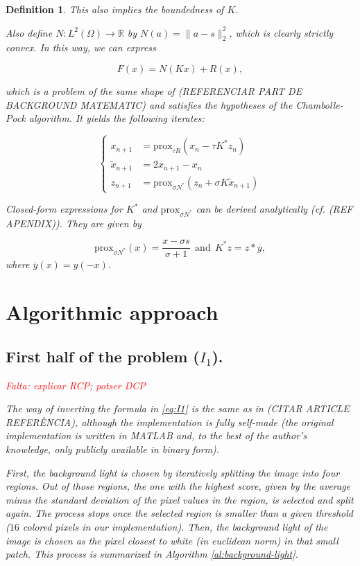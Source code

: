 \documentclass[twocolumn,twoside,a4paper,10pt]{IEEEtran}
\newtheorem{definition}{Definition}
\newcommand{\Frank}[1]{\textcolor{red}{#1}}
\begin{document}
\begin{definition}
This also implies the boundedness of \(K\).

Also define \(N\colon L^2(\Omega)\to \mathbb{R}\) by \(N(a) = \|a - s\|_{2}^2\), which is clearly strictly convex. In this way, we can express

\[
  F(x) = N(Kx) + R(x),
\]

which is a problem of the same shape of (REFERENCIAR PART DE BACKGROUND MATEMATIC) and satisfies the hypotheses of the Chambolle-Pock algorithm. It yields the following iterates:

\begin{equation}\label{eq:iterates}
  \left\{
  \begin{split}
    x_{n+1} & = \text{prox}_{\tau R}(x_n - \tau K^*z_n) \\
    \tilde{x}_{n+1} & = 2x_{n+1} - x_n \\
    z_{n+1} & = \text{prox}_{\sigma N^*}(z_n + \sigma K\tilde{x}_{n+1})
  \end{split}
  \right.
\end{equation}

Closed-form expressions for \(K^*\) and \(\text{prox}_{\sigma N^*}\) can be derived analytically (cf. (REF APENDIX)). They are given by

\begin{equation}\label{eq:primal-dual-analytical}
  \text{prox}_{\sigma N^*}(x) = \frac{x-\sigma s}{\sigma + 1} ~~ \text{and} ~~ K^*z = z\ast \overline{y},
\end{equation}
where \(\overline{y}(x) = y(-x)\).


\section{Algorithmic approach}
\subsection{First half of the problem (\(I_1\)).}
\Frank{Falta: explicar RCP; potser DCP}

The way of inverting the formula in \cref{eq:I1} is the same as in (CITAR ARTICLE REFERÈNCIA), although the implementation is fully self-made (the original implementation is written in MATLAB and, to the best of the author's knowledge, only publicly available in binary form).

First, the background light is chosen by iteratively splitting the image into four regions. Out of those regions, the one with the highest score, given by the average minus the standard deviation of the pixel values in the region, is selected and split again. The process stops once the selected region is smaller than a given threshold (\(16\) colored pixels in our implementation). Then, the background light of the image is chosen as the pixel closest to white (in euclidean norm) in that small patch. This process is summarized in Algorithm \ref{al:background-light}.


\end{definition}
\end{document}
